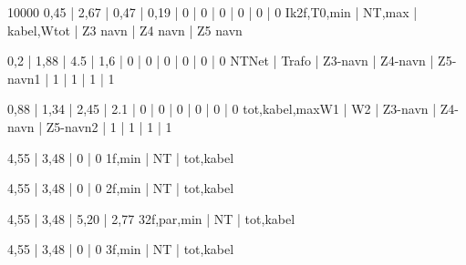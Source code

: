 \documentclass[a4paper,oneside,10pt,danish]{report}
\begin{document}
\begin{HV-ZtilIk3f}{10000}{ 0,45 | 2,67 | 0,47 | 0,19 | 0 | 0 | 0 | 0 | 0 | 0 }{Ik2f,T0,min | NT,max | kabel,Wtot | Z3 navn | Z4 navn | Z5 navn}
\end{HV-ZtilIk3f}

\begin{Ztotal}{ 0,2 | 1,88 | 4.5 | 1,6 | 0 | 0 | 0 | 0 | 0 | 0 }{NT}{Net | Trafo | Z3-navn | Z4-navn | Z5-navn}{1 | 1 | 1 | 1 | 1}
\end{Ztotal}

\begin{LV-Ztotal-max}{ 0,88 | 1,34 | 2,45 | 2.1 | 0 | 0 | 0 | 0 | 0 | 0 }{tot,kabel,max}{W1 | W2 | Z3-navn | Z4-navn | Z5-navn}{2 | 1 | 1 | 1 | 1}
\end{LV-Ztotal-max}

\begin{LV-Ik1f-kA}{ 4,55 | 3,48 | 0 | 0 }{1f,min | NT | tot,kabel}
\end{LV-Ik1f-kA}

\begin{LV-Ik2f-kA}{ 4,55 | 3,48 | 0 | 0 }{2f,min | NT | tot,kabel}
\end{LV-Ik2f-kA}

\begin{LV-Ik2f,parSikr-kA}{ 4,55 | 3,48 | 5,20 | 2,77 }{3}{2f,par,min | NT | tot,kabel}
\end{LV-Ik2f,parSikr-kA}

\begin{LV-Ik3f-kA}{ 4,55 | 3,48 | 0 | 0 }{3f,min | NT | tot,kabel}
\end{LV-Ik3f-kA}
\end{document}
